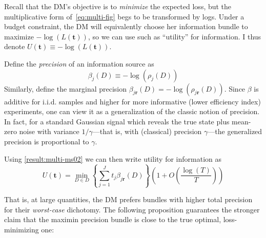 \documentclass{fancyArticle}
\renewcommand{\|}{\,|\,}                    %
\providecommand{\;}{\,;}                    %
\begin{document}
Recall that the DM's objective is to \textit{minimize} the expected loss, but the multiplicative form of~\autoref{eq:multi-fig} begs to be transformed by logs.
Under a budget constraint, the DM will equivalently choose her information bundle to maximize $-\log(L(\mathbf{t}))$, so we can use such as ``utility'' for information. I thus denote $U(\mathbf{t})\equiv -\log(L(\mathbf{t}))$.

Define the \textit{precision} of an information source as
\begin{equation*}
  \label{eq:precision-definition}
  \beta_{j}(D) \equiv -\log(\rho_{j}(D))
\end{equation*}
Similarly, define the marginal precision $\beta_{j\mathbf{r}}(D)=-\log(\rho_{j\mathbf{r}}(D))$.
Since $\beta$ is additive for i.i.d. samples and higher for more informative (lower efficiency index) experiments, one can view it as a generalization of the classic notion of precision.
In fact, for a standard Gaussian signal which reveals the true state plus mean-zero noise with variance $1/\gamma$---that is, with (classical) precision $\gamma$---the generalized precision is proportional to $\gamma$.

Using \autoref{result:multi-ms02} we can then write utility for information as
\begin{equation}
  \label{eq:info-utility}
  U(\mathbf{t}) = \min_{D\in D}\left\{ \sum_{j=1}^J t_j \beta_{j \mathbf{r}}(D) \right\}
  \left( 1 + O\left(\frac{\log(T)}{T}\right) \right)
\end{equation}

That is, at large quantities, the DM prefers bundles with higher total precision for their \textit{worst-case} dichotomy.
The following proposition guarantees the stronger claim that the maximin precision bundle is close to the true optimal, loss-minimizing one:
\end{document}
